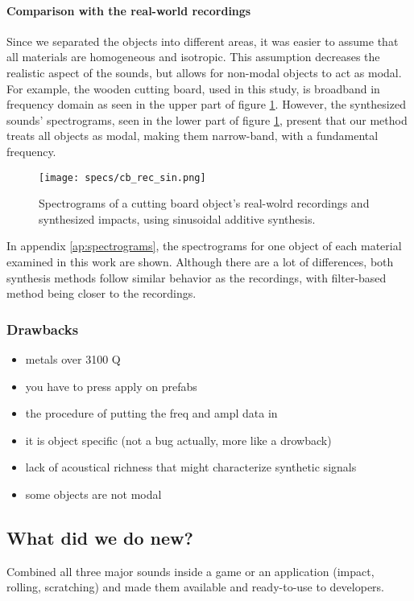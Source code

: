 \paragraph{Comparison with the real-world recordings\\}
Since we separated the objects into different areas, it was easier to assume that all materials are homogeneous and isotropic. This assumption decreases the realistic aspect of the sounds, but allows for non-modal objects to act as modal. For example, the wooden cutting board, used in this study, is broadband in frequency domain as seen in the upper part of figure \ref{fig:specs_cb}. However, the synthesized sounds' spectrograms, seen in the lower part of figure \ref{fig:specs_cb}, present that our method treats all objects as modal, making them narrow-band, with a fundamental frequency.  

\begin{figure}[H]
  \centering
    \texttt{[image: specs/cb\_rec\_sin.png]}
      \caption{Spectrograms of a cutting board object's real-wolrd recordings and synthesized impacts, using sinusoidal additive synthesis.}
      \label{fig:specs_cb}
\end{figure}

In appendix \ref{ap:spectrograms}, the spectrograms for one object of each material examined in this work are shown. Although there are a lot of differences, both synthesis methods follow similar behavior as the recordings, with filter-based method being closer to the recordings.  

\subsubsection{Drawbacks}
\begin{itemize}
\item metals over 3100 Q
\item you have to press apply on prefabs
\item the procedure of putting the freq and ampl data in
\item it is object specific (not a bug actually, more like a drowback)
\item lack of acoustical richness that might characterize synthetic signals \cite{giordano2006material}
\item some objects are not modal
\end{itemize}

\subsection{What did we do new?}
Combined all three major sounds inside a game or an application (impact, rolling, scratching) and made them available and ready-to-use to developers.

